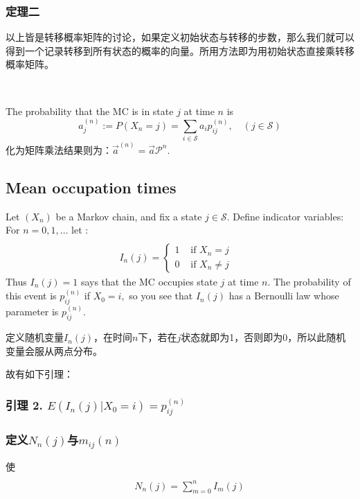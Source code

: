 \documentclass[UTF8]{ctexart}
\begin{document}
\subsubsection{定理二}

以上皆是转移概率矩阵的讨论，如果定义初始状态与转移的步数，那么我们就可以得到一个记录转移到所有状态的概率的向量。所用方法即为用初始状态直接乘转移概率矩阵。

\

The probability that the MC is in state $j$ at time $n$ is
$$
a_{j}^{(n)}:=P\left(X_{n}=j\right)=\sum_{i \in \mathcal{S}} a_{i} p_{i j}^{(n)}, \quad(j \in \mathcal{S})
$$
化为矩阵乘法结果则为：$\vec{a}^{(n)}=\vec{a} \mathcal{P}^{n}$.

\subsection{Mean occupation times} 

Let $\left(X_{n}\right)$ be a Markov chain, and fix a state $j \in \mathcal{S} .$ Define indicator variables: For $ n=0,1, \ldots $ let :
$$
\begin{array}{ll}
 & \\
I_{n}(j)=\left\{\begin{array}{ll}
1 & \text { if } X_{n}=j \\
0 & \text { if } X_{n} \neq j
\end{array}\right.
\end{array}
$$
Thus $I_{n}(j)=1$ says that the MC occupies state $j$ at time $n .$ The probability of this event is $p_{i j}^{(n)}$ if $X_{0}=i,$ so you see that $I_{n}(j)$ has a Bernoulli law whose parameter is $p_{i j}^{(n)} .$ 

定义随机变量$I_{n}(j)$，在时间$n$下，若在$j$状态就即为1，否则即为0，所以此随机变量会服从两点分布。

故有如下引理：

\subsubsection{引理 2. $E\left(I_{n}(j) | X_{0}=i\right)=p_{i j}^{(n)}$} 

\subsubsection{定义$N_n(j)$与$m_{i j}(n)$}
使
$$
\begin{array}{l}
\\
\qquad N_{n}(j)=\sum_{m=0}^{n} I_{m}(j)
\end{array}
$$
\end{document}
